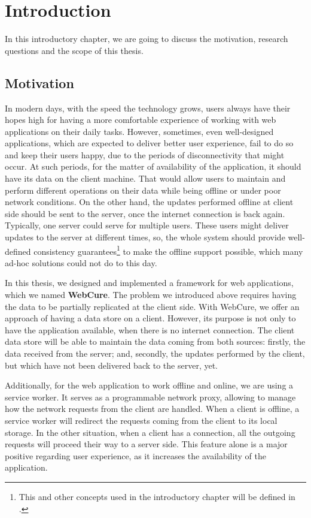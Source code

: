 \chapter{Introduction}
\label{Introduction}

In this introductory chapter, we are going to discuss the motivation, research questions and the scope of this thesis.

\section{Motivation}
\label{Introduction-Motivation}

In modern days, with the speed the technology grows, users always have their hopes high for having a more comfortable experience of working with web applications on their daily tasks. However, sometimes, even well-designed applications, which are expected to deliver better user experience, fail to do so and keep their users happy, due to the periods of disconnectivity that might occur. At such periods, for the matter of availability of the application, it should have its data on the client machine. That would allow users to maintain and perform different operations on their data while being offline or under poor network conditions. On the other hand, the updates performed offline at client side should be sent to the server, once the internet connection is back again. Typically, one server could serve for multiple users. These users might deliver updates to the server at different times, so, the whole system should provide well-defined consistency guarantees\footnote{This and other concepts used in the introductory chapter will be defined in .} to make the offline support possible, which many ad-hoc solutions could not do to this day.

In this thesis, we designed and implemented a framework for web applications, which we named \textbf{WebCure}. The problem we introduced above requires having the data to be partially replicated at the client side. With WebCure, we offer an approach of having a data store on a client. However, its purpose is not only to have the application available, when there is no internet connection. The client data store will be able to maintain the data coming from both sources: firstly, the data received from the server; and, secondly, the updates performed by the client, but which have not been delivered back to the server, yet. 

Additionally, for the web application to work offline and online, we are using a service worker. It serves as a programmable network proxy\cite{32}, allowing to manage how the network requests from the client are handled. When a client is offline, a service worker will redirect the requests coming from the client to its local storage. In the other situation, when a client has a connection, all the outgoing requests will proceed their way to a server side. This feature alone is a major positive regarding user experience, as it increases the availability of the application. 

